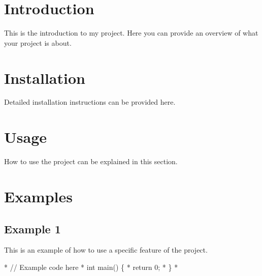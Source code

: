 \hypertarget{index_intro}{}\section{Introduction}\label{index_intro}
This is the introduction to my project. Here you can provide an overview of what your project is about.\hypertarget{index_install}{}\section{Installation}\label{index_install}
Detailed installation instructions can be provided here.\hypertarget{index_usage}{}\section{Usage}\label{index_usage}
How to use the project can be explained in this section.\hypertarget{index_examples}{}\section{Examples}\label{index_examples}
\hypertarget{index_example1}{}\subsection{Example 1}\label{index_example1}
This is an example of how to use a specific feature of the project.


\begin{DoxyCode}
* \textcolor{comment}{// Example code here}
* \textcolor{keywordtype}{int} main() \{
*     \textcolor{keywordflow}{return} 0;
* \}
* 
\end{DoxyCode}
 
